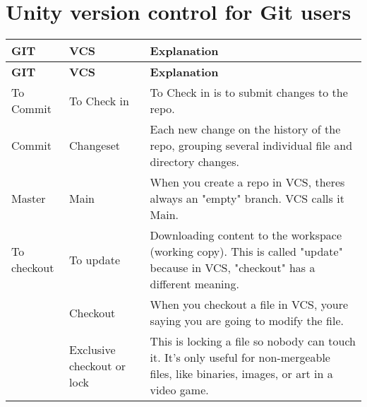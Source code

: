 \chapter{Unity version control for Git users}
\hypertarget{md__library_2_package_cache_2com_8unity_8collab-proxy_0d2_83_81_2_documentation_0i_2_git_users}{}\label{md__library_2_package_cache_2com_8unity_8collab-proxy_0d2_83_81_2_documentation_0i_2_git_users}
\label{md__library_2_package_cache_2com_8unity_8collab-proxy_0d2_83_81_2_documentation_0i_2_git_users_autotoc_md135}%
%
 \tabulinesep=1mm
\begin{longtabu}spread 0pt [c]{*{3}{|X[-1]}|}
\hline
\cellcolor{\tableheadbgcolor}\textbf{ {\bfseries{GIT}}   }&\cellcolor{\tableheadbgcolor}\textbf{ {\bfseries{ VCS}}   }&\cellcolor{\tableheadbgcolor}\textbf{ {\bfseries{Explanation}}    }\\
\endfirsthead
\hline
\endfoot
\hline
\cellcolor{\tableheadbgcolor}\textbf{ {\bfseries{GIT}}   }&\cellcolor{\tableheadbgcolor}\textbf{ {\bfseries{ VCS}}   }&\cellcolor{\tableheadbgcolor}\textbf{ {\bfseries{Explanation}}    }\\
\endhead
To Commit   &To Check in   &To Check in is to submit changes to the repo.    \\
Commit   &Changeset   &Each new change on the history of the repo, grouping several individual file and directory changes.    \\
Master   &Main   &When you create a repo in  VCS, there\textquotesingle{}s always an "{}empty"{} branch.  VCS calls it Main.    \\
To checkout   &To update   &Downloading content to the workspace (working copy). This is called "{}update"{} because in  VCS, "{}checkout"{} has a different meaning.    \\
&Checkout   &When you checkout a file in  VCS, you\textquotesingle{}re saying you are going to modify the file.    \\
&Exclusive checkout or lock   &This is locking a file so nobody can touch it. It’s only useful for non-\/mergeable files, like binaries, images, or art in a video game.    \\

\end{longtabu}
